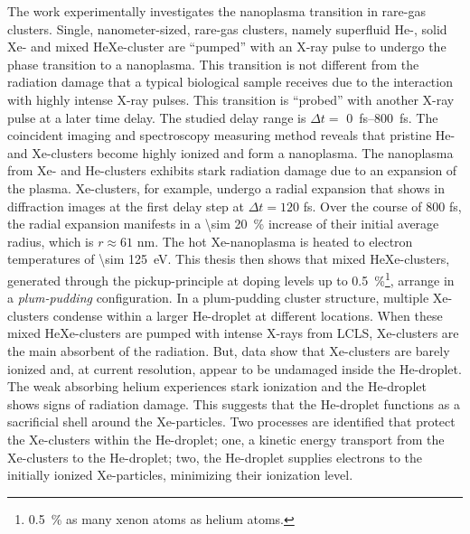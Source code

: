 The work experimentally investigates the nanoplasma transition in rare-gas clusters. Single, nanometer-sized, rare-gas clusters, namely superfluid He-, solid Xe- and mixed HeXe-cluster are ``pumped'' with an X-ray pulse to undergo the phase transition to a nanoplasma. This transition is not different from the radiation damage that a typical biological sample receives due to the interaction with highly intense X-ray pulses. This transition is ``probed'' with another X-ray pulse at a later time delay. The studied delay range is $\Delta t=$ \SIrange{0}{800}{\femto\second}. The coincident imaging and spectroscopy measuring method reveals that pristine He- and Xe-clusters become highly ionized and form a nanoplasma. The nanoplasma from Xe- and He-clusters exhibits stark radiation damage due to an expansion of the plasma. Xe-clusters, for example, undergo a radial expansion that shows in diffraction images at the first delay step at $\Delta t = 120$ fs. Over the course of 800 fs, the radial expansion manifests in a \SI{\sim 20}{\percent} increase of their initial average radius, which is $r\approx 61$ nm. The hot Xe-nanoplasma is heated to electron temperatures of \SI{\sim 125}{\electronvolt}. This thesis then shows that mixed HeXe-clusters, generated through the pickup-principle at doping levels up to \SI{0.5}{\percent}\footnote{\SI{0.5}{\percent} as many xenon atoms as helium atoms.}, arrange in a \textit{plum-pudding} configuration. In a plum-pudding cluster structure, multiple Xe-clusters condense within a larger He-droplet at different locations. When these mixed HeXe-clusters are pumped with intense X-rays from LCLS, Xe-clusters are the main absorbent of the radiation. But, data show that Xe-clusters are barely ionized and, at current resolution, appear to be undamaged inside the He-droplet. The weak absorbing helium experiences stark ionization and the He-droplet shows signs of radiation damage. This suggests that the He-droplet functions as a sacrificial shell around the Xe-particles. Two processes are identified that protect the Xe-clusters within the He-droplet; one, a kinetic energy transport from the Xe-clusters to the He-droplet; two, the He-droplet supplies electrons to the initially ionized Xe-particles, minimizing their ionization level.\\[1\baselineskip]
%
